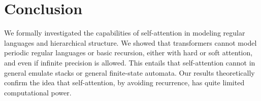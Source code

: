 \documentclass[11pt,a4paper]{article}
\begin{document}







\section{Conclusion}
We formally investigated the capabilities of self-attention in modeling regular languages and hierarchical structure.
We showed that transformers cannot model periodic regular languages or basic recursion, either with hard or soft attention, and even if infinite precision is allowed. %
This entails that self-attention cannot in general emulate stacks or general finite-state automata.
Our results theoretically confirm the idea that self-attention, by avoiding recurrence, has quite limited computational power.





\end{document}
